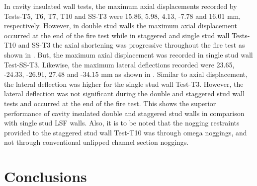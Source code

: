 In cavity insulated wall tests, the maximum axial displacements recorded by Tests-T5, T6, T7, T10 and SS-T3 were 15.86, 5.98, 4.13, -7.78 and 16.01 mm, respectively. However, in double stud walls the maximum axial displacement occurred at the end of the fire test while in staggered and single stud wall Tests-T10 and SS-T3 the axial shortening was progressive throughout the fire test as shown in . But, the maximum axial displacement was recorded in single stud wall Test-SS-T3. Likewise, the maximum lateral deflections recorded were 23.65, -24.33, -26.91, 27.48 and -34.15 mm as shown in . Similar to axial displacement, the lateral deflection was higher for the single stud wall Test-T3. However, the lateral deflection was not significant during the double and staggered stud wall tests and occurred at the end of the fire test. This shows the superior performance of cavity insulated double and staggered stud walls in comparison with single stud LSF walls. Also, it is to be noted that the nogging restraints provided to the staggered stud wall Test-T10 was through omega noggings, and not through conventional unlipped channel section noggings.

\section{Conclusions}

